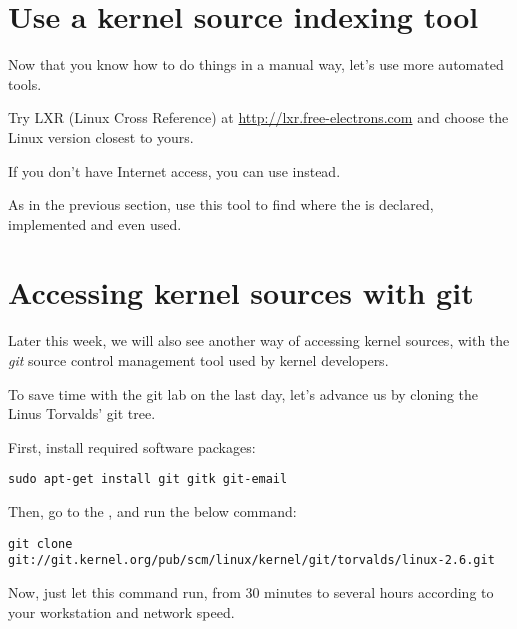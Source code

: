 \section{Use a kernel source indexing tool}

Now that you know how to do things in a manual way, let's use more
automated tools.

Try LXR (Linux Cross Reference) at \url{http://lxr.free-electrons.com}
and choose the Linux version closest to yours.

If you don't have Internet access, you can use  instead.

As in the previous section, use this tool to find where
the  is declared, implemented and
even used.

\section{Accessing kernel sources with git}

Later this week, we will also see another way of accessing kernel
sources, with the {\em git} source control management tool used by kernel
developers.

To save time with the git lab on the last day, let's advance us by
cloning the Linus Torvalds' git tree.

First, install required software packages:

\begin{verbatim}
sudo apt-get install git gitk git-email
\end{verbatim}

Then, go to the , and run
the below command:

\small
\begin{verbatim}
git clone git://git.kernel.org/pub/scm/linux/kernel/git/torvalds/linux-2.6.git
\end{verbatim}
\normalsize

Now, just let this command run, from 30 minutes to several hours
according to your workstation and network speed.
